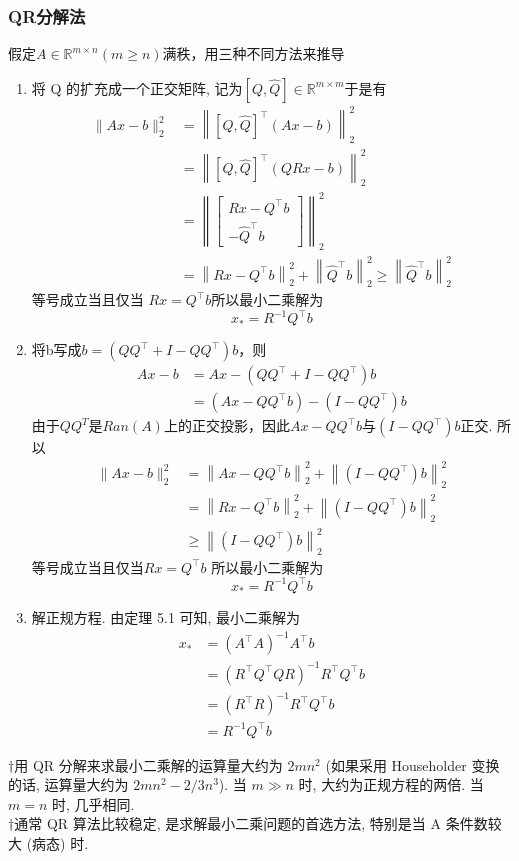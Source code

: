 \documentclass[12pt,a4paper]{article}
\begin{document}
\subsubsection{QR分解法}
假定$A \in \mathbb{R}^{m \times n}(m \geq n)$满秩，用三种不同方法来推导
\begin{enumerate}[(1)]
	\item 将 Q 的扩充成一个正交矩阵, 记为$[Q, \hat{Q}] \in \mathbb{R}^{m \times m}$于是有
	$$
	\begin{aligned}\|A x-b\|_{2}^{2} &=\left\|[Q, \hat{Q}]^{\top}(A x-b)\right\|_{2}^{2} \\ &=\left\|[Q, \hat{Q}]^{\top}(Q R x-b)\right\|_{2}^{2} \\ &=\left\|\left[\begin{array}{c}{R x-Q^{\top} b} \\ {-\hat{Q}^{\top} b}\end{array}\right]\right\|_{2}^{2} \\ &=\left\|R x-Q^{\top} b\right\|_{2}^{2}+\left\|\hat{Q}^{\top} b\right\|_{2}^{2} \geq\left\|\hat{Q}^{\top} b\right\|_{2}^{2} \end{aligned}
	$$等号成立当且仅当 $R x=Q^{\top} b$所以最小二乘解为
	$$
	x_{*}=R^{-1} Q^{\top} b
	$$
	\item 将b写成$b=\left(Q Q^{\top}+I-Q Q^{\top}\right) b$，则
	$$
	\begin{aligned} A x-b &=A x-\left(Q Q^{\top}+I-Q Q^{\top}\right) b \\ &=\left(A x-Q Q^{\top} b\right)-\left(I-Q Q^{\top}\right) b \end{aligned}
	$$
	由于$QQ^{T}$是$Ran(A)$上的正交投影，因此$A x-Q Q^{\top} b$与$\left(I-Q Q^{\top}\right) b$正交. 所以
	$$
	\begin{aligned}\|A x-b\|_{2}^{2} &=\left\|A x-Q Q^{\top} b\right\|_{2}^{2}+\left\|\left(I-Q Q^{\top}\right) b\right\|_{2}^{2} \\ &=\left\|R x-Q^{\top} b\right\|_{2}^{2}+\left\|\left(I-Q Q^{\top}\right) b\right\|_{2}^{2} \\ & \geq\left\|\left(I-Q Q^{\top}\right) b\right\|_{2}^{2} \end{aligned}
	$$等号成立当且仅当$R x=Q^{\top} b$ 所以最小二乘解为
	$$
	x_{*}=R^{-1} Q^{\top} b
	$$
	\item 解正规方程. 由定理 5.1 可知, 最小二乘解为
	$$
	\begin{aligned} x_{*} &=\left(A^{\top} A\right)^{-1} A^{\top} b \\ &=\left(R^{\top} Q^{\top} Q R\right)^{-1} R^{\top} Q^{\top} b \\ &=\left(R^{\top} R\right)^{-1} R^{\top} Q^{\top} b \\ &=R^{-1} Q^{\top} b \end{aligned}
	$$
\end{enumerate}
$\dagger$用 QR 分解来求最小二乘解的运算量大约为 $2mn^{2}$ (如果采用 Householder 变换的话, 运算量大约为 $2mn^{2} - 2/3n^{3}$). 当 $m \gg n$ 时, 大约为正规方程的两倍. 当 $m = n$ 时, 几乎相同.\\
$\dagger$通常 QR 算法比较稳定, 是求解最小二乘问题的首选方法, 特别是当 A 条件数较大 (病态) 时.
\end{document}
